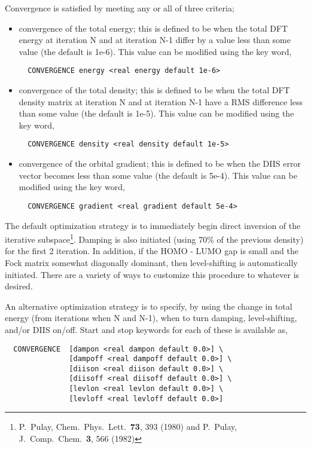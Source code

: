 Convergence is satisfied by meeting any or all of three criteria;
\begin{itemize}
\item convergence of the total energy; this is defined to be when the
  total DFT energy at iteration N and at iteration N-1 differ by a value less
  than some value (the default is 1e-6).  This value can be modified
  using the key word,
\begin{verbatim}
  CONVERGENCE energy <real energy default 1e-6>
\end{verbatim}

\item convergence of the total density; this is defined to be when the
  total DFT density matrix at iteration N and at iteration N-1 have a
  RMS difference less than some value (the default is 1e-5).  This value can be modified
  using the key word,
\begin{verbatim}
  CONVERGENCE density <real density default 1e-5>
\end{verbatim}

\item convergence of the orbital gradient; this is defined to be when the
  DIIS error vector becomes less than some value (the default is
  5e-4).  This value can be modified using the key word,
\begin{verbatim}
  CONVERGENCE gradient <real gradient default 5e-4>
\end{verbatim}
\end{itemize}

The default optimization strategy is to immediately begin direct
inversion of the iterative subspace\footnote {P.~Pulay, Chem.\ Phys.\ 
  Lett.\ {\bf 73}, 393 (1980) and P.~Pulay, J.~Comp.~Chem.~{\bf 3},
  566 (1982)}.  Damping is also initiated (using 70\% of the previous
density) for the first 2 iteration.  In addition, if the HOMO - LUMO
gap is small and the Fock matrix somewhat diagonally dominant, then
level-shifting is automatically initiated.  There are a variety of ways
to customize this procedure to whatever is desired.

An alternative optimization strategy is to specify, by using the change 
in total energy (from iterations when N and N-1), when to turn
damping, level-shifting, and/or DIIS on/off.  Start and stop keywords for
each of these is available as,
\begin{verbatim}
  CONVERGENCE  [dampon <real dampon default 0.0>] \
               [dampoff <real dampoff default 0.0>] \
               [diison <real diison default 0.0>] \
               [diisoff <real diisoff default 0.0>] \
               [levlon <real levlon default 0.0>] \
               [levloff <real levloff default 0.0>]
\end{verbatim}

